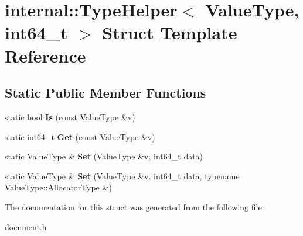 \hypertarget{a00316}{}\section{internal\+:\+:Type\+Helper$<$ Value\+Type, int64\+\_\+t $>$ Struct Template Reference}
\label{a00316}
\subsection*{Static Public Member Functions}
\begin{DoxyCompactItemize}
\item 
static bool {\bfseries Is} (const Value\+Type \&v)\hypertarget{a00316_a43c171bfbe873941a1b2be698a95de74}{}\label{a00316_a43c171bfbe873941a1b2be698a95de74}

\item 
static int64\+\_\+t {\bfseries Get} (const Value\+Type \&v)\hypertarget{a00316_abe3368c8817cafe420a8b3f7d6ec1759}{}\label{a00316_abe3368c8817cafe420a8b3f7d6ec1759}

\item 
static Value\+Type \& {\bfseries Set} (Value\+Type \&v, int64\+\_\+t data)\hypertarget{a00316_a0c7b71569c12346902a396111782b12b}{}\label{a00316_a0c7b71569c12346902a396111782b12b}

\item 
static Value\+Type \& {\bfseries Set} (Value\+Type \&v, int64\+\_\+t data, typename Value\+Type\+::\+Allocator\+Type \&)\hypertarget{a00316_a85471fa774b4a8f4f56c191694a7f278}{}\label{a00316_a85471fa774b4a8f4f56c191694a7f278}

\end{DoxyCompactItemize}


The documentation for this struct was generated from the following file\+:\begin{DoxyCompactItemize}
\item 
\hyperlink{a00473}{document.\+h}\end{DoxyCompactItemize}
